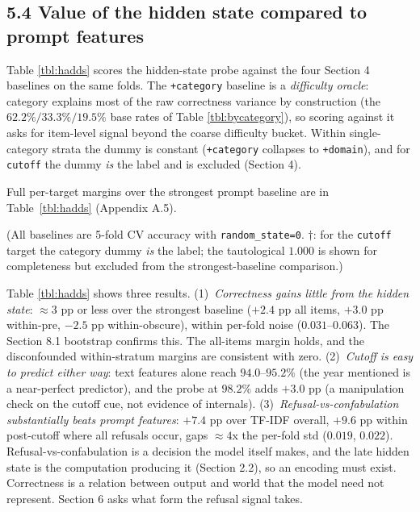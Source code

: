 \subsection{5.4 Value of the hidden state compared to prompt
features}\label{value-of-the-hidden-state-compared-to-prompt-features}

Table \ref{tbl:hadds} scores the hidden-state probe against the four
Section 4 baselines on the same folds. The \texttt{+category} baseline
is a \emph{difficulty oracle}: category explains most of the raw
correctness variance by construction (the \(62.2\%/33.3\%/19.5\%\) base
rates of Table \ref{tbl:bycategory}), so scoring against it asks for
item-level signal beyond the coarse difficulty bucket. Within
single-category strata the dummy is constant (\texttt{+category}
collapses to \texttt{+domain}), and for \texttt{cutoff} the dummy
\emph{is} the label and is excluded (Section 4).

Full per-target margins over the strongest prompt baseline are in
Table~\ref{tbl:hadds} (Appendix A.5).

(All baselines are 5-fold CV accuracy with \texttt{random\_state=0}.
\(\dagger\): for the \texttt{cutoff} target the category dummy \emph{is}
the label; the tautological \(1.000\) is shown for completeness but
excluded from the strongest-baseline comparison.)

Table \ref{tbl:hadds} shows three results. (1)~\emph{Correctness
gains little from the hidden state}: \(\approx 3\) pp or less over the
strongest baseline (\(+2.4\) pp all items, \(+3.0\) pp within-pre, \(-2.5\) pp
within-obscure), within per-fold noise (\(0.031\)--\(0.063\)). The Section 8.1 bootstrap confirms this. The all-items margin holds, and the disconfounded within-stratum margins are consistent with zero.
(2)~\emph{Cutoff is easy to predict either way}: text features alone
reach \(94.0\)--\(95.2\%\) (the year mentioned is a near-perfect
predictor), and the probe at \(98.2\%\) adds \(+3.0\) pp (a manipulation check on the cutoff cue, not evidence of internals).
(3)~\emph{Refusal-vs-confabulation substantially beats prompt
features}: \(+7.4\) pp over TF-IDF overall, \(+9.6\) pp within
post-cutoff where all refusals occur, gaps \(\approx 4\)x the per-fold
std (\(0.019\), \(0.022\)). Refusal-vs-confabulation is a decision the model itself makes,
and the late hidden state is the computation producing it (Section
2.2), so an encoding must exist. Correctness is a relation between
output and world that the model need not represent. Section 6 asks what form the refusal signal takes.
